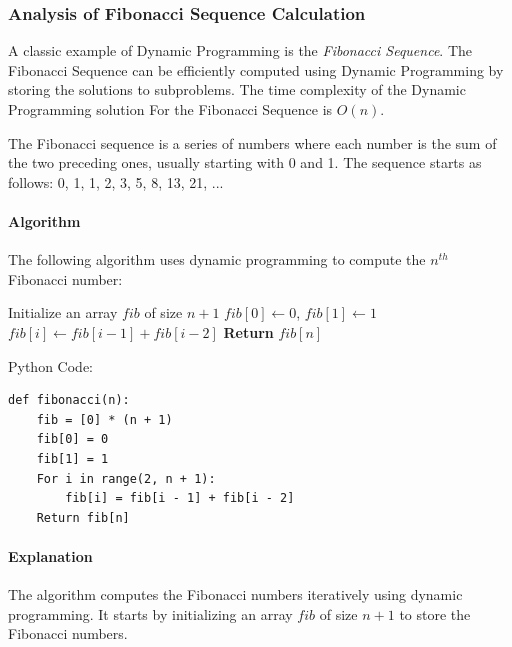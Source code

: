 \documentclass[12pt]{book} %
\begin{document}
\subsubsection{Analysis of Fibonacci Sequence Calculation}
A classic example of Dynamic Programming is the \textit{Fibonacci Sequence}. The Fibonacci Sequence can be efficiently computed using Dynamic Programming by storing the solutions to subproblems. The time complexity of the Dynamic Programming solution For the Fibonacci Sequence is $O(n)$.

The Fibonacci sequence is a series of numbers where each number is the sum of the two preceding ones, usually starting with 0 and 1. The sequence starts as follows: 0, 1, 1, 2, 3, 5, 8, 13, 21, ...

\paragraph{Algorithm}

The following algorithm uses dynamic programming to compute the $n^{th}$ Fibonacci number:
\FloatBarrier %
\begin{algorithm}
\caption{Fibonacci Sequence with Dynamic Programming}
\begin{algorithmic}[1]
    \State Initialize an array $fib$ of size $n+1$
    \State $fib[0] \gets 0$, $fib[1] \gets 1$
        \State $fib[i] \gets fib[i-1] + fib[i-2]$
    \EndFor
    \State \textbf{Return} $fib[n]$
\EndProcedure
\end{algorithmic}
\end{algorithm}
\FloatBarrier %
Python Code:
\FloatBarrier %
\begin{verbatim}
def fibonacci(n):
    fib = [0] * (n + 1)
    fib[0] = 0
    fib[1] = 1
    For i in range(2, n + 1):
        fib[i] = fib[i - 1] + fib[i - 2]
    Return fib[n]
\end{verbatim}
\FloatBarrier %
\paragraph{Explanation}

The algorithm computes the Fibonacci numbers iteratively using dynamic programming. It starts by initializing an array $fib$ of size $n+1$ to store the Fibonacci numbers.
\end{document}
